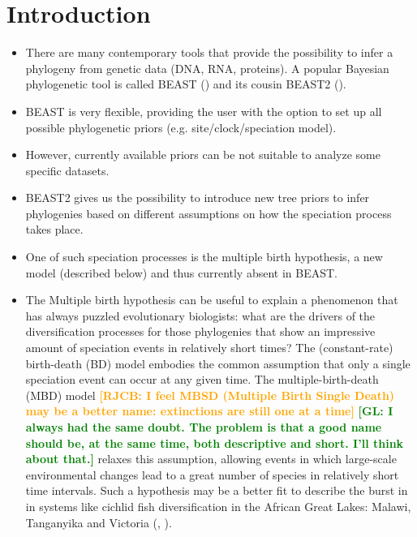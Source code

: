 \documentclass{article}
\newcommand*\richel[1]{\textcolor{orange}{\textbf{[RJCB: #1]}}}
\newcommand*\gio[1]{\textcolor{green}{\textbf{[GL: #1]}}}
\begin{document}
\section{Introduction}
\begin{itemize}

\item There are many contemporary tools that provide the possibility to infer a phylogeny from genetic data (DNA, RNA, proteins). A popular Bayesian
phylogenetic tool is called BEAST (\cite{beast}) and its cousin BEAST2 (\cite{beast2}).

\item BEAST is very flexible, providing the user with the option to set up all possible phylogenetic priors (e.g. site/clock/speciation model).

\item However, currently available priors can be not suitable to analyze some specific datasets. 

\item BEAST2 gives us the possibility to introduce new tree priors to infer phylogenies based on different assumptions on how the speciation process
takes place.

\item One of such speciation processes is the multiple birth hypothesis,
a new model (described below) and thus currently absent in BEAST.

\item The Multiple birth hypothesis can be useful to explain a phenomenon that has always puzzled evolutionary biologists: what are the drivers of the diversification processes for those phylogenies that show an impressive amount of speciation events in relatively short times? 
The (constant-rate) birth-death (BD) model embodies the common assumption that 
only a single speciation event can occur at any given time.
The multiple-birth-death (MBD) model 
\richel{I feel MBSD (Multiple Birth Single Death) may be a better name: extinctions are still one at a time}
\gio{I always had the same doubt. The problem is that a good name should be, at the same time, both descriptive and short. I'll think about that.}
relaxes this assumption, allowing events in which 
large-scale environmental changes lead to a great number of species 
in relatively short time intervals. Such a hypothesis may be a better fit to describe the burst in in systems like cichlid fish diversification in the 
African Great Lakes: Malawi, Tanganyika and Victoria (\cite{janzen2016}, \cite{janzen2017}).


\end{itemize}
\end{document}
